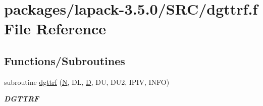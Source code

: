 \hypertarget{dgttrf_8f}{}\section{packages/lapack-\/3.5.0/\+S\+R\+C/dgttrf.f File Reference}
\label{dgttrf_8f}
\subsection*{Functions/\+Subroutines}
\begin{DoxyCompactItemize}
\item 
subroutine \hyperlink{group__doubleGTcomputational_ga8ca64e542924cec56cbe9837b77d25b7}{dgttrf} (\hyperlink{polmisc_8c_a0240ac851181b84ac374872dc5434ee4}{N}, D\+L, \hyperlink{odrpack_8h_a7dae6ea403d00f3687f24a874e67d139}{D}, D\+U, D\+U2, I\+P\+I\+V, I\+N\+F\+O)
\begin{DoxyCompactList}\small\item\em {\bfseries D\+G\+T\+T\+R\+F} \end{DoxyCompactList}\end{DoxyCompactItemize}
